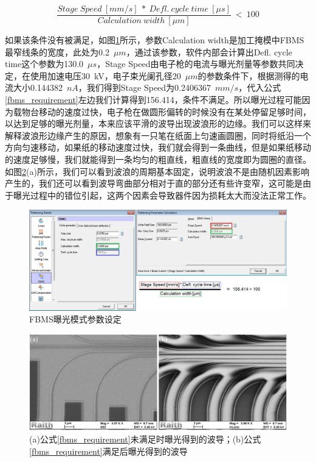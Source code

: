 \begin{equation}
\label{fbms_requirement}
\dfrac{Stage~Speed~[mm/s]~*~Defl.~cycle~time~[\mu s]}{Calculation~width~[\mu m]}~<~100
\end{equation}

如果该条件没有被满足，如图\ref{edg_fbms_width}所示，参数Calculation width是加工掩模中FBMS最窄线条的宽度，此处为0.2~$\mu m$，通过该参数，软件内部会计算出Defl. cycle time这个参数为130.0~$\mu s$，Stage Speed由电子枪的电流与曝光剂量等参数共同决定，在使用加速电压30~kV，电子束光阑孔径20~$\mu m$的参数条件下，根据测得的电流大小0.144382~$nA$，我们得到Stage Speed为0.2406367~$mm/s$，代入公式\ref{fbms_requirement}左边我们计算得到156.414，条件不满足。所以曝光过程可能因为载物台移动的速度过快，电子枪在做圆形偏转的时候没有在某处停留足够时间，以达到足够的曝光剂量，本来应该平滑的波导出现波浪形的边缘。我们可以这样来解释波浪形边缘产生的原因，想象有一只笔在纸面上匀速画圆圈，同时将纸沿一个方向匀速移动，如果纸的移动速度过快，我们就会得到一条曲线，但是如果纸移动的速度足够慢，我们就能得到一条均匀的粗直线，粗直线的宽度即为圆圈的直径。如图\ref{edg_ripple}(a)所示，我们可以看到波浪的周期基本固定，说明波浪不是由随机因素影响产生的，我们还可以看到波导弯曲部分相对于直的部分还有些许变窄，这可能是由于曝光过程中的错位引起，这两个因素会导致器件因为损耗太大而没法正常工作。

\begin{figure}[htb]
	\centering
	\includegraphics[width=15cm]{./Pictures/edg_fbms_width.png}
	\captionsetup{justification=centering}
	\caption{FBMS曝光模式参数设定}
	\label{edg_fbms_width}
\end{figure}

\begin{figure}[htb]
	\centering
	\includegraphics[width=15cm]{./Pictures/edg_ripple.jpg}
	\captionsetup{justification=centering}
	\caption{(a)公式\ref{fbms_requirement}未满足时曝光得到的波导；(b)公式\ref{fbms_requirement}满足后曝光得到的波导}
	\label{edg_ripple}
\end{figure}

